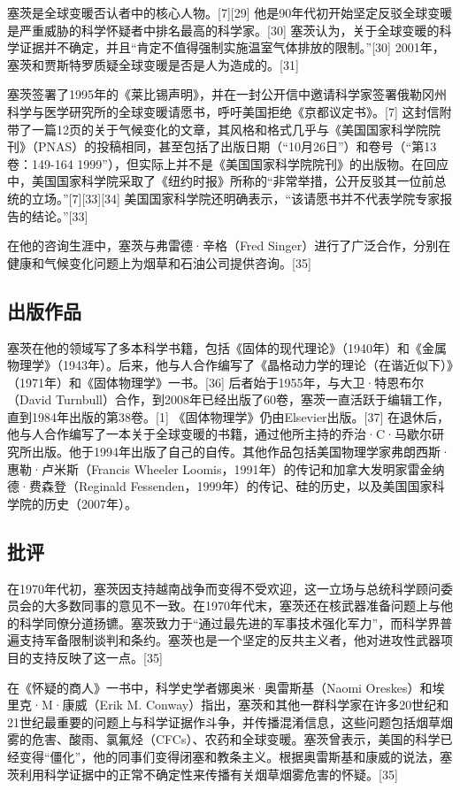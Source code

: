 塞茨是全球变暖否认者中的核心人物。[7][29] 他是90年代初开始坚定反驳全球变暖是严重威胁的科学怀疑者中排名最高的科学家。[30] 塞茨认为，关于全球变暖的科学证据并不确定，并且“肯定不值得强制实施温室气体排放的限制。”[30] 2001年，塞茨和贾斯特罗质疑全球变暖是否是人为造成的。[31]

塞茨签署了1995年的《莱比锡声明》，并在一封公开信中邀请科学家签署俄勒冈州科学与医学研究所的全球变暖请愿书，呼吁美国拒绝《京都议定书》。[7] 这封信附带了一篇12页的关于气候变化的文章，其风格和格式几乎与《美国国家科学院院刊》（PNAS）的投稿相同，甚至包括了出版日期（“10月26日”）和卷号（“第13卷：149-164 1999”），但实际上并不是《美国国家科学院院刊》的出版物。在回应中，美国国家科学院采取了《纽约时报》所称的“非常举措，公开反驳其一位前总统的立场。”[7][33][34] 美国国家科学院还明确表示，“该请愿书并不代表学院专家报告的结论。”[33]

在他的咨询生涯中，塞茨与弗雷德·辛格（Fred Singer）进行了广泛合作，分别在健康和气候变化问题上为烟草和石油公司提供咨询。[35]
\subsection{出版作品}  
塞茨在他的领域写了多本科学书籍，包括《固体的现代理论》（1940年）和《金属物理学》（1943年）。后来，他与人合作编写了《晶格动力学的理论（在谐近似下）》（1971年）和《固体物理学》一书。[36] 后者始于1955年，与大卫·特恩布尔（David Turnbull）合作，到2008年已经出版了60卷，塞茨一直活跃于编辑工作，直到1984年出版的第38卷。[1] 《固体物理学》仍由Elsevier出版。[37] 在退休后，他与人合作编写了一本关于全球变暖的书籍，通过他所主持的乔治·C·马歇尔研究所出版。他于1994年出版了自己的自传。其他作品包括美国物理学家弗朗西斯·惠勒·卢米斯（Francis Wheeler Loomis，1991年）的传记和加拿大发明家雷金纳德·费森登（Reginald Fessenden，1999年）的传记、硅的历史，以及美国国家科学院的历史（2007年）。
\subsection{批评}  
在1970年代初，塞茨因支持越南战争而变得不受欢迎，这一立场与总统科学顾问委员会的大多数同事的意见不一致。在1970年代末，塞茨还在核武器准备问题上与他的科学同僚分道扬镳。塞茨致力于“通过最先进的军事技术强化军力”，而科学界普遍支持军备限制谈判和条约。塞茨也是一个坚定的反共主义者，他对进攻性武器项目的支持反映了这一点。[35]

在《怀疑的商人》一书中，科学史学者娜奥米·奥雷斯基（Naomi Oreskes）和埃里克·M·康威（Erik M. Conway）指出，塞茨和其他一群科学家在许多20世纪和21世纪最重要的问题上与科学证据作斗争，并传播混淆信息，这些问题包括烟草烟雾的危害、酸雨、氯氟烃（CFCs）、农药和全球变暖。塞茨曾表示，美国的科学已经变得“僵化”，他的同事们变得闭塞和教条主义。根据奥雷斯基和康威的说法，塞茨利用科学证据中的正常不确定性来传播有关烟草烟雾危害的怀疑。[35]

